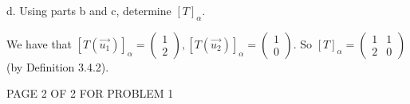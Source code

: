 \documentclass[12pt]{article}
\newenvironment{problem}[2][Problem]
{
	\begin{trivlist} 
		\item[\hskip \labelsep {\bfseries #1 #2:}]
	}
{
	\end{trivlist}
	}
\newenvironment{solution}[1][Solution]
{
	\begin{trivlist} 
		\item[\hskip \labelsep {\itshape #1:}]
	}
	{
	\end{trivlist}
}
\begin{document}
\begin{problem}{5}
\noindent
\newline
\newline
d. Using parts b and c, determine $[T]_{\alpha}$.
\begin{solution}
We have that $[T(\vec{u_{1}})]_{\alpha}=\begin{pmatrix} 1\\2 \end{pmatrix}, [T(\vec{u_{2}})]_{\alpha} = \begin{pmatrix} 1 \\ 0 \end{pmatrix}$. So $[T]_{\alpha} = \begin{pmatrix} 1 & 1 \\ 2 & 0 \end{pmatrix}$ (by Definition 3.4.2).
\end{solution}

\vfill
\centerline{PAGE 2 OF 2 FOR PROBLEM 1}
\end{problem}
\end{document}
